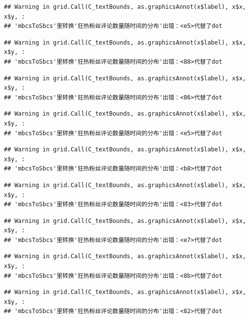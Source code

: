 \documentclass[
]{article}
\begin{document}
\begin{verbatim}
## Warning in grid.Call(C_textBounds, as.graphicsAnnot(x$label), x$x, x$y, :
## 'mbcsToSbcs'里转换'狂热粉丝评论数量随时间的分布'出错：<e5>代替了dot
\end{verbatim}

\begin{verbatim}
## Warning in grid.Call(C_textBounds, as.graphicsAnnot(x$label), x$x, x$y, :
## 'mbcsToSbcs'里转换'狂热粉丝评论数量随时间的分布'出错：<88>代替了dot
\end{verbatim}

\begin{verbatim}
## Warning in grid.Call(C_textBounds, as.graphicsAnnot(x$label), x$x, x$y, :
## 'mbcsToSbcs'里转换'狂热粉丝评论数量随时间的分布'出错：<86>代替了dot
\end{verbatim}

\begin{verbatim}
## Warning in grid.Call(C_textBounds, as.graphicsAnnot(x$label), x$x, x$y, :
## 'mbcsToSbcs'里转换'狂热粉丝评论数量随时间的分布'出错：<e5>代替了dot
\end{verbatim}

\begin{verbatim}
## Warning in grid.Call(C_textBounds, as.graphicsAnnot(x$label), x$x, x$y, :
## 'mbcsToSbcs'里转换'狂热粉丝评论数量随时间的分布'出错：<b8>代替了dot
\end{verbatim}

\begin{verbatim}
## Warning in grid.Call(C_textBounds, as.graphicsAnnot(x$label), x$x, x$y, :
## 'mbcsToSbcs'里转换'狂热粉丝评论数量随时间的分布'出错：<83>代替了dot
\end{verbatim}

\begin{verbatim}
## Warning in grid.Call(C_textBounds, as.graphicsAnnot(x$label), x$x, x$y, :
## 'mbcsToSbcs'里转换'狂热粉丝评论数量随时间的分布'出错：<e7>代替了dot
\end{verbatim}

\begin{verbatim}
## Warning in grid.Call(C_textBounds, as.graphicsAnnot(x$label), x$x, x$y, :
## 'mbcsToSbcs'里转换'狂热粉丝评论数量随时间的分布'出错：<8b>代替了dot
\end{verbatim}

\begin{verbatim}
## Warning in grid.Call(C_textBounds, as.graphicsAnnot(x$label), x$x, x$y, :
## 'mbcsToSbcs'里转换'狂热粉丝评论数量随时间的分布'出错：<82>代替了dot
\end{verbatim}
\end{document}
